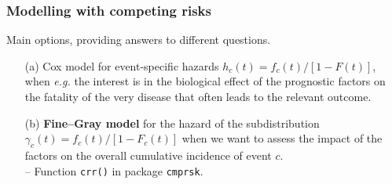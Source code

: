 \documentclass[12pt]{beamer}
\begin{document}
\begin{frame}
\frametitle{Modelling with competing risks}

Main options, providing answers to different questions.

\begin{itemize}
\item[(a)]
  Cox model for event-specific hazards $h_c(t) = f_c(t)/[1-F(t)]$, when \textit{e.g.} the interest is in the biological effect of the prognostic factors on the fatality of the very disease that often leads to the relevant outcome.  
  \bigskip 
\item[(b)]
 \textbf{Fine--Gray model} for the hazard  of the subdistribution $\gamma_c(t) = f_c(t)/[1-F_c(t)]$ 
  when we want to assess the impact of the factors on the overall cumulative incidence of event $c$.  \\
  -- Function \texttt{crr()} in package \texttt{cmprsk}. 
\end{itemize}
\end{frame}
\end{document}
